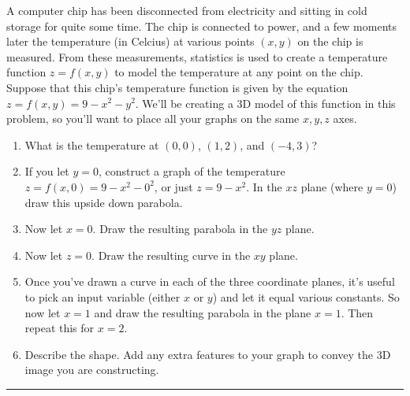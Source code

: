 \begin{problem}\label{surface graph for a function of two variables}%
%
 A computer chip has been disconnected from electricity and sitting in cold storage for quite some time.  The chip is connected to power, and a few moments later the temperature (in Celcius) at various points $(x,y)$ on the chip is measured. From these measurements, statistics is used to create a temperature function $z=f(x,y)$ to model the temperature at any point on the chip. Suppose that this chip's temperature function is given by the equation $z=f(x,y)=9-x^2-y^2$. We'll be creating a 3D model of this function in this problem, so you'll want to place all your graphs on the same $x,y,z$ axes.
\begin{enumerate}
 \item What is the temperature at $(0,0)$, $(1,2)$, and $(-4,3)$? 
 \item If you let $y=0$, construct a graph of the temperature $z=f(x,0) = 9-x^2-0^2$, or just $z=9-x^2$. In the $xz$ plane (where $y=0$) draw this upside down parabola.
 \item Now let $x=0$. Draw the resulting parabola in the $yz$ plane.
 \item Now let $z=0$. Draw the resulting curve in the $xy$ plane.
 \item Once you've drawn a curve in each of the three coordinate planes, it's useful to pick an input variable (either $x$ or $y$) and let it equal various constants. So now let $x=1$ and draw the resulting parabola in the plane $x=1$.  Then repeat this for $x=2$.
 \item Describe the shape. Add any extra features to your graph to convey the 3D image you are constructing. 
\end{enumerate}
\hrule\end{problem}

